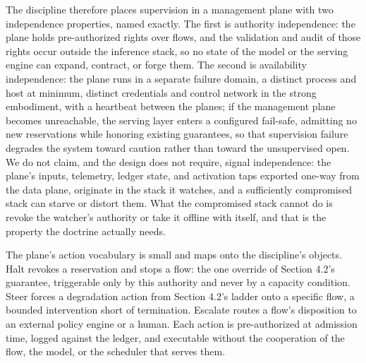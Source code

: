 The discipline therefore places supervision in a management plane with
two independence properties, named exactly. The first is authority
independence: the plane holds pre-authorized rights over flows, and the
validation and audit of those rights occur outside the inference stack,
so no state of the model or the serving engine can expand, contract, or
forge them. The second is availability independence: the plane runs in a
separate failure domain, a distinct process and host at minimum, distinct
credentials and control network in the strong embodiment, with a
heartbeat between the planes; if the management plane becomes
unreachable, the serving layer enters a configured fail-safe, admitting
no new reservations while honoring existing guarantees, so that
supervision failure degrades the system toward caution rather than toward
the unsupervised open. We do not claim, and the design does not require,
signal independence: the plane's inputs, telemetry, ledger state, and
activation taps exported one-way from the data plane, originate in the
stack it watches, and a sufficiently compromised stack can starve or
distort them. What the compromised stack cannot do is revoke the
watcher's authority or take it offline with itself, and that is the
property the doctrine actually needs.

The plane's action vocabulary is small and maps onto the discipline's
objects. Halt revokes a reservation and stops a flow: the one override of
Section 4.2's guarantee, triggerable only by this authority and never by
a capacity condition. Steer forces a degradation action from Section
4.2's ladder onto a specific flow, a bounded intervention short of
termination. Escalate routes a flow's disposition to an external policy
engine or a human. Each action is pre-authorized at admission time,
logged against the ledger, and executable without the cooperation of the
flow, the model, or the scheduler that serves them.


